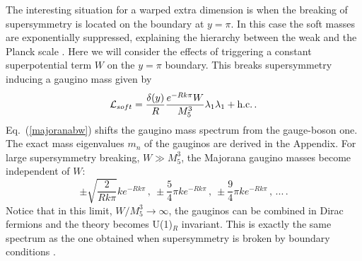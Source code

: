 \documentclass[a4paper,12pt]{article}
\begin{document}
The interesting situation for a warped extra dimension is when
the breaking of supersymmetry is located on the boundary at $y=\pi$.
In this case the soft masses are  exponentially suppressed,
explaining the hierarchy between the weak and the Planck scale 
\cite{gp,gp2,lsp,dkkls}.
Here we will consider
the effects of triggering a constant 
superpotential
term $W$ on the $y=\pi$ boundary. 
This breaks supersymmetry
 inducing a gaugino mass  given by
\begin{equation}
{\cal L}_{soft}=\frac{\delta(y)}{R}\frac{e^{-Rk\pi }W}
{M^3_5}\lambda_1\lambda_1+\text{h.c.}\, .
\label{majoranabw}
\end{equation}
Eq.~(\ref{majoranabw}) shifts the gaugino mass spectrum
from the gauge-boson one. 
The exact mass eigenvalues $m_n$ of 
the gauginos are derived in the Appendix.
For large supersymmetry breaking, $W\gg M_5^3$, 
the Majorana gaugino masses become independent of $W$: 
\begin{equation}
 \pm \sqrt{\frac{2}{Rk\pi}}ke^{-Rk\pi}\, ,\
\pm \frac{5}{4}\pi ke^{-Rk\pi}\, ,\
\pm \frac{9}{4}\pi ke^{-Rk\pi}\, ,\, ...\, .
\end{equation}
Notice that in 
this limit, $W/M^3_5\rightarrow\infty$,
the gauginos can be combined in  Dirac fermions
and the theory becomes U(1)$_R$ invariant.
This  is exactly the same spectrum 
as the one obtained when supersymmetry is broken by
boundary conditions \cite{gp2}.
\end{document}
